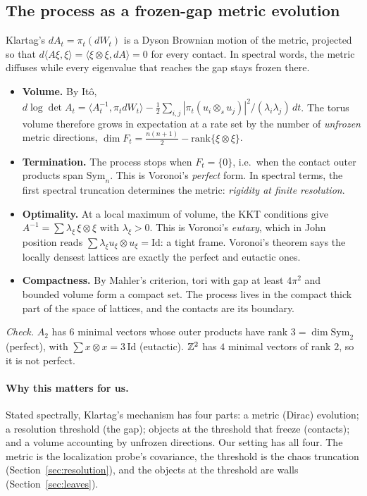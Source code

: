 \subsection{The process as a frozen-gap metric evolution}
Klartag's $dA_t=\pi_t(dW_t)$ is a Dyson Brownian motion of the metric, projected so that $d\langle A\xi,\xi\rangle=\langle\xi\otimes\xi,dA\rangle=0$
for every contact. In spectral words, the metric diffuses while every eigenvalue that reaches the gap stays frozen there.
\begin{itemize}[leftmargin=*]
\item \textbf{Volume.} By It\^o, $d\log\det A_t=\langle A_t^{-1},\pi_tdW_t\rangle-\frac12\sum_{i,j}|\pi_t(u_i\otimes_su_j)|^2/(\lambda_i\lambda_j)\,dt$. The torus volume
therefore grows in expectation at a rate set by the number of \emph{unfrozen} metric directions,
$\dim F_t=\frac{n(n+1)}2-\mathrm{rank}\{\xi\otimes\xi\}$.
\item \textbf{Termination.} The process stops when $F_t=\{0\}$, i.e.\ when the contact outer products span $\mathrm{Sym}_n$. This is
Voronoi's \emph{perfect} form. In spectral terms, the first spectral truncation determines the metric: \emph{rigidity at finite
resolution}.
\item \textbf{Optimality.} At a local maximum of volume, the KKT conditions give $A^{-1}=\sum\lambda_\xi\,\xi\otimes\xi$ with $\lambda_\xi>0$. This is
Voronoi's \emph{eutaxy}, which in John position reads $\sum\lambda_\xi u_\xi\otimes u_\xi=\mathrm{Id}$: a tight frame. Voronoi's theorem
says the locally densest lattices are exactly the perfect and eutactic ones.
\item \textbf{Compactness.} By Mahler's criterion, tori with gap at least $4\pi^2$ and bounded volume form a compact set. The process
lives in the compact thick part of the space of lattices, and the contacts are its boundary.
\end{itemize}
\emph{Check.} $A_2$ has $6$ minimal vectors whose outer products have rank $3=\dim\mathrm{Sym}_2$ (perfect), with $\sum x\otimes x=3\,\mathrm{Id}$
(eutactic). $\mathbb Z^2$ has $4$ minimal vectors of rank $2$, so it is not perfect.

\paragraph{Why this matters for us.} Stated spectrally, Klartag's mechanism has four parts: a metric (Dirac) evolution; a resolution
threshold (the gap); objects at the threshold that freeze (contacts); and a volume accounting by unfrozen directions. Our setting has
all four. The metric is the localization probe's covariance, the threshold is the chaos truncation (Section~\ref{sec:resolution}), and
the objects at the threshold are walls (Section~\ref{sec:leaves}).
